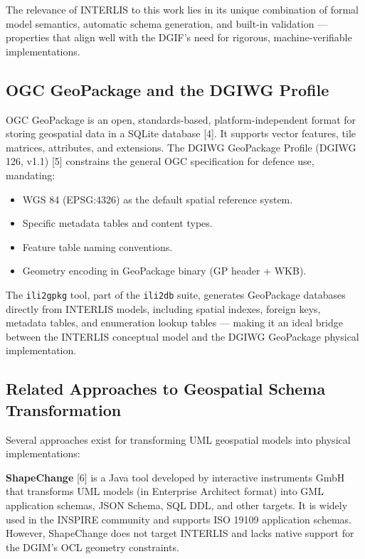 \documentclass[conference]{IEEEtran}
\begin{document}
The relevance of INTERLIS to this work lies in its unique combination of formal model semantics, automatic schema generation, and built-in validation — properties that align well with the DGIF's need for rigorous, machine-verifiable implementations.

\subsection{OGC GeoPackage and the DGIWG Profile}

OGC GeoPackage is an open, standards-based, platform-independent format for storing geospatial data in a SQLite database [4]. It supports vector features, tile matrices, attributes, and extensions. The DGIWG GeoPackage Profile (DGIWG 126, v1.1) [5] constrains the general OGC specification for defence use, mandating:

\begin{itemize}[leftmargin=*]
\item WGS 84 (EPSG:4326) as the default spatial reference system.
\item Specific metadata tables and content types.
\item Feature table naming conventions.
\item Geometry encoding in GeoPackage binary (GP header + WKB).
\end{itemize}

The \texttt{ili2gpkg} tool, part of the \texttt{ili2db} suite, generates GeoPackage databases directly from INTERLIS models, including spatial indexes, foreign keys, metadata tables, and enumeration lookup tables — making it an ideal bridge between the INTERLIS conceptual model and the DGIWG GeoPackage physical implementation.

\subsection{Related Approaches to Geospatial Schema Transformation}

Several approaches exist for transforming UML geospatial models into physical implementations:

\textbf{ShapeChange} [6] is a Java tool developed by interactive instruments GmbH that transforms UML models (in Enterprise Architect format) into GML application schemas, JSON Schema, SQL DDL, and other targets. It is widely used in the INSPIRE community and supports ISO 19109 application schemas. However, ShapeChange does not target INTERLIS and lacks native support for the DGIM's OCL geometry constraints.
\end{document}
